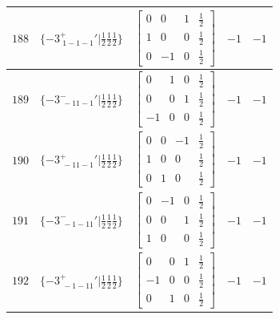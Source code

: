 \documentclass[fleqn,8pt]{jsarticle}
\begin{document}
\begin{longtable}{ccccc}
$ 188 $ & $ \{-3^{+}_{\,\,1-1-1}{}'|\frac{1}{2} \frac{1}{2} \frac{1}{2}\} $ & $ \begin{bmatrix} 0 & 0 & 1 & \frac{1}{2} \\ 1 & 0 & 0 & \frac{1}{2} \\ 0 & -1 & 0 & \frac{1}{2} \end{bmatrix} $ & $ -1 $ & $ -1 $ \\ \hline
$ 189 $ & $ \{-3^{-}_{\,\,-11-1}{}'|\frac{1}{2} \frac{1}{2} \frac{1}{2}\} $ & $ \begin{bmatrix} 0 & 1 & 0 & \frac{1}{2} \\ 0 & 0 & 1 & \frac{1}{2} \\ -1 & 0 & 0 & \frac{1}{2} \end{bmatrix} $ & $ -1 $ & $ -1 $ \\ \hline
$ 190 $ & $ \{-3^{+}_{\,\,-11-1}{}'|\frac{1}{2} \frac{1}{2} \frac{1}{2}\} $ & $ \begin{bmatrix} 0 & 0 & -1 & \frac{1}{2} \\ 1 & 0 & 0 & \frac{1}{2} \\ 0 & 1 & 0 & \frac{1}{2} \end{bmatrix} $ & $ -1 $ & $ -1 $ \\ \hline
$ 191 $ & $ \{-3^{-}_{\,\,-1-11}{}'|\frac{1}{2} \frac{1}{2} \frac{1}{2}\} $ & $ \begin{bmatrix} 0 & -1 & 0 & \frac{1}{2} \\ 0 & 0 & 1 & \frac{1}{2} \\ 1 & 0 & 0 & \frac{1}{2} \end{bmatrix} $ & $ -1 $ & $ -1 $ \\ \hline
$ 192 $ & $ \{-3^{+}_{\,\,-1-11}{}'|\frac{1}{2} \frac{1}{2} \frac{1}{2}\} $ & $ \begin{bmatrix} 0 & 0 & 1 & \frac{1}{2} \\ -1 & 0 & 0 & \frac{1}{2} \\ 0 & 1 & 0 & \frac{1}{2} \end{bmatrix} $ & $ -1 $ & $ -1 $ \\
\end{longtable}
\end{document}
